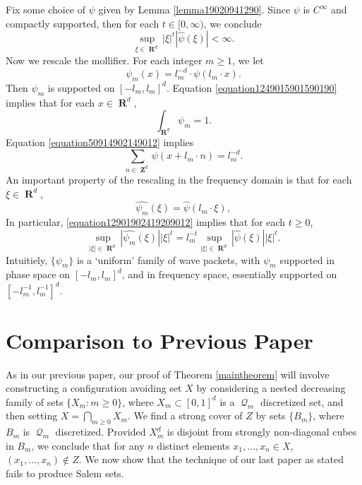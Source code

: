 \documentclass[12pt,reqno]{article}
\numberwithin{equation}{section}
\DeclareMathOperator{\RR}{\mathbf{R}}
\DeclareMathOperator{\ZZ}{\mathbf{Z}}
\DeclareMathOperator{\DQ}{\mathcal{Q}}
\begin{document}
Fix some choice of $\psi$ given by Lemma \ref{lemma19020941290}. Since $\psi$ is $C^\infty$ and compactly supported, then for each $t \in [0,\infty)$, we conclude
%
\begin{equation} \label{equation682928418931289}
	\sup_{\xi \in \RR^d} |\xi|^t |\widehat{\psi}(\xi)| < \infty.
\end{equation}
%
Now we rescale the mollifier. For each integer $m \geq 1$, we let
%
\[ \psi_m(x) = l_m^{-d} \cdot \psi(l_m \cdot x). \]
%
Then $\psi_m$ is supported on $[-l_m,l_m]^d$. Equation \eqref{equation1249015901590190} implies that for each $x \in \RR^d$,
%
\begin{equation} \label{equation19204910490190190}
	\int_{\RR^d} \psi_m = 1.
\end{equation}
%
Equation \eqref{equation50914902149012} implies
%
\begin{equation} \label{equation990249012409129041290} \sum_{n \in \ZZ^d} \psi(x + l_m \cdot n) = l_m^{-d}. \end{equation}
%
An important property of the rescaling in the frequency domain is that for each $\xi \in \RR^d$,
%
\begin{equation} \label{equation12901902419209012}
    \widehat{\psi_m}(\xi) = \widehat{\psi}(l_m \cdot \xi),
\end{equation}
%
In particular, \eqref{equation12901902419209012} implies that for each $t \geq 0$,
%
\begin{equation}
    \sup_{|\xi| \in \RR^d} |\widehat{\psi_m}(\xi)| |\xi|^t = l_m^{-t} \sup_{|\xi| \in \RR^d} |\widehat{\psi}(\xi)| |\xi|^t.
\end{equation}
%
Intuitiely, $\{ \psi_m \}$ is a `uniform' family of wave packets, with $\psi_m$ supported in phase space on $[-l_m,l_m]^d$, and in frequency space, essentially supported on $[-l_m^{-1}, l_m^{-1}]^d$.

\section{Comparison to Previous Paper}

As in our previous paper, our proof of Theorem \ref{maintheorem} will involve constructing a configuration avoiding set $X$ by considering a nested decreasing family of sets $\{ X_m : m \geq 0 \}$, where $X_m \subset [0,1]^d$ is a $\DQ_m$ discretized set, and then setting $X = \bigcap_{m \geq 0} X_m$. We find a strong cover of $Z$ by sets $\{ B_m \}$, where $B_m$ is $\DQ_m$ discretized. Provided $X_m^d$ is disjoint from strongly non-diagonal cubes in $B_m$, we conclude that for any $n$ distinct elements $x_1, \dots, x_n \in X$, $(x_1,\dots,x_n) \not \in Z$. We now show that the technique of our last paper as stated fails to produce Salem sets.
\end{document}
